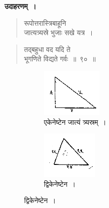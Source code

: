 \documentclass[11pt, openany]{book}
\begin{document}
 \textbf{उदाहरणम्~।} 
\begin{quote}
    \bqt 
    रूपोत्तरास्त्रिबाहूनि \\
जात्यत्र्यस्रे भुजाः सखे यत्र~। 
\end{quote}
\newpage%
\begin{quote}
    \bqt 
    तद्बहुधा वद यदि ते \\
भूगणिते विद्यते गर्वः~॥~९०~॥~
\end{quote}
\vspace{-2mm}
 
\begin{figure}[h!]
     \centering
     \begin{subfigure}[b]{0.48\textwidth}
         \centering
         \captionsetup{labelformat=empty}
          \caption{एकेनेष्टेन जात्यं त्र्यस्रम्~।}
\vspace{-2mm}
         \includegraphics[scale=0.85]{graphics/capture147.png}
     \end{subfigure}
     \hfill
     \begin{subfigure}[b]{0.48\textwidth}
         \centering
         \captionsetup{labelformat=empty}
          \caption{द्विकेनेष्टेन~।}
\vspace{-2mm}
         \includegraphics[scale=0.85]{graphics/capture147'.png}
     \end{subfigure}
\end{figure}
\vspace{-2mm}
\end{document}
